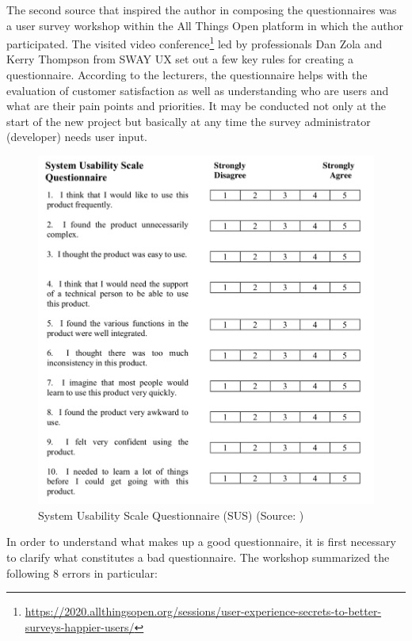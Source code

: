 \documentclass[a4paper,10pt,twoside]{article}
\begin{document}
The second source that inspired the author in composing the questionnaires was a user survey workshop within the All Things Open platform in which the author participated. The visited video conference\footnote{\url{https://2020.allthingsopen.org/sessions/user-experience-secrets-to-better-surveys-happier-users/}} led by professionals Dan Zola and Kerry Thompson from SWAY UX set out a few key rules for creating a questionnaire. According to the lecturers, the questionnaire helps with the evaluation of customer satisfaction as well as understanding who are users and what are their pain points and priorities. It may be conducted not only at the start of the new project but basically at any time the survey administrator (developer) needs user input.

\vspace{0.3cm}
\begin{figure}[hbt!] 
\begin{center}
\includegraphics[width=14cm]{../pictures/sus.png} 
\caption[System Usability Scale Questionnaire (SUS) ]{System Usability Scale Questionnaire (SUS) (Source: \cite{sus})}
\label{fig:sus}
\end{center}
\end{figure}

\newpage
\noindent In order to understand what makes up a good questionnaire, it is first necessary to clarify what constitutes a bad questionnaire. The workshop summarized the following 8 errors in particular:
\end{document}
